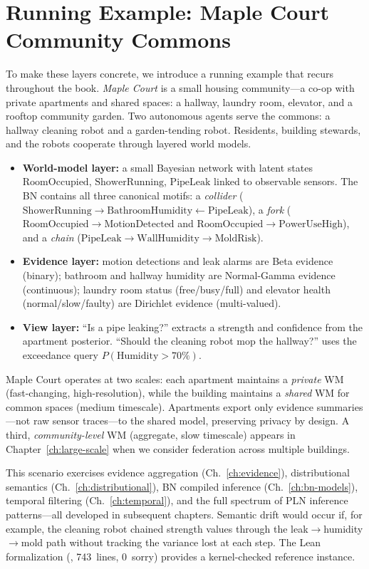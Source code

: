 \documentclass[11pt,openany]{report}
\begin{document}
\section{Running Example: Maple Court Community Commons}
\label{sec:maple-court}
To make these layers concrete, we introduce a running example that
recurs throughout the book.  \emph{Maple Court} is a small housing
community---a co-op with private apartments and shared spaces: a hallway,
laundry room, elevator, and a rooftop community garden.  Two autonomous
agents serve the commons: a hallway cleaning robot and a garden-tending
robot.  Residents, building stewards, and the robots cooperate through
layered world models.

\begin{itemize}
\item \textbf{World-model layer:} a small Bayesian network with latent
  states $\mathrm{RoomOccupied}$, $\mathrm{ShowerRunning}$,
  $\mathrm{PipeLeak}$ linked to observable sensors.  The BN contains
  all three canonical motifs: a \emph{collider}
  ($\mathrm{ShowerRunning} \to \mathrm{BathroomHumidity} \leftarrow
   \mathrm{PipeLeak}$),
  a \emph{fork}
  ($\mathrm{RoomOccupied} \to \mathrm{MotionDetected}$ and
   $\mathrm{RoomOccupied} \to \mathrm{PowerUseHigh}$),
  and a \emph{chain}
  ($\mathrm{PipeLeak} \to \mathrm{WallHumidity} \to \mathrm{MoldRisk}$).
\item \textbf{Evidence layer:} motion detections and leak alarms are
  Beta evidence (binary); bathroom and hallway humidity are Normal-Gamma
  evidence (continuous); laundry room status (free/busy/full) and
  elevator health (normal/slow/faulty) are Dirichlet evidence
  (multi-valued).
\item \textbf{View layer:} ``Is a pipe leaking?'' extracts a strength
  and confidence from the apartment posterior.  ``Should the cleaning
  robot mop the hallway?'' uses the exceedance query
  $P(\mathrm{Humidity} > 70\%)$.
\end{itemize}

Maple Court operates at two scales: each apartment maintains a
\emph{private} WM (fast-changing, high-resolution), while the building
maintains a \emph{shared} WM for common spaces (medium timescale).
Apartments export only evidence summaries---not raw sensor traces---to
the shared model, preserving privacy by design.  A third,
\emph{community-level} WM (aggregate, slow timescale) appears in
Chapter~\ref{ch:large-scale} when we consider federation across
multiple buildings.

This scenario exercises evidence aggregation (Ch.~\ref{ch:evidence}),
distributional semantics (Ch.~\ref{ch:distributional}), BN compiled
inference (Ch.~\ref{ch:bn-models}), temporal filtering
(Ch.~\ref{ch:temporal}), and the full spectrum of PLN inference
patterns---all developed in subsequent chapters.  Semantic drift would
occur if, for example, the cleaning robot chained strength values
through the leak$\to$humidity$\to$mold path without tracking the
variance lost at each step.  The Lean formalization
(, 743~lines,
0~sorry) provides a kernel-checked reference instance.
\end{document}
